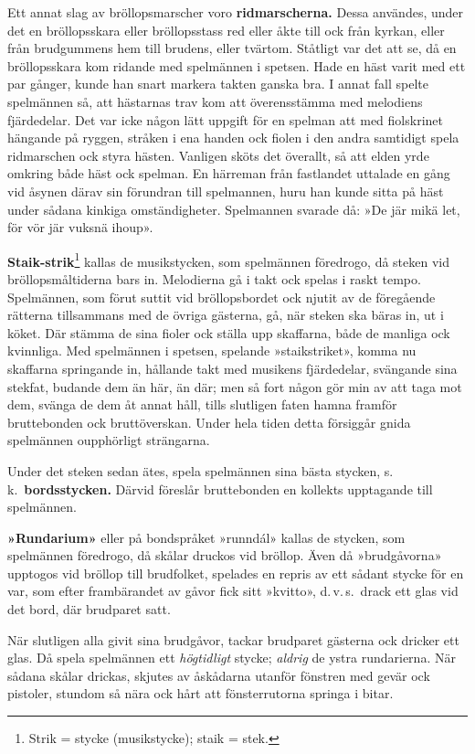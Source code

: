 \begin{multicols}{2}
Ett annat slag av bröllopsmarscher voro \textbf{ridmarscherna.} Dessa
användes, under det en bröllopsskara eller bröllopsstass red eller
åkte till ock från kyrkan, eller från brudgummens hem till brudens,
eller tvärtom. Ståtligt var det att se, då en bröllopsskara kom ridande
med spelmännen i spetsen. Hade en häst varit med ett par gånger, kunde
han snart markera takten ganska bra. I annat fall spelte spelmännen
så, att hästarnas trav kom att överensstämma med melodiens fjärdedelar.
Det var icke någon lätt uppgift för en spelman att med fiolskrinet
hängande på ryggen, stråken i ena handen ock fiolen i den andra samtidigt
spela ridmarschen ock styra hästen. Vanligen sköts det överallt, så
att elden yrde omkring både häst ock spelman. En härreman från fastlandet
uttalade en gång vid åsynen därav sin förundran till spelmannen, huru
han kunde sitta på häst under sådana kinkiga omständigheter. Spelmannen
svarade då: »De jär mikä let, för vör jär vuksnä ihoup».

\textbf{Staik-strik}\footnote{Strik = stycke (musikstycke); staik = stek.}
kallas de musikstycken, som spelmännen föredrogo, då steken vid bröllops\-mål\-tid\-erna
bars in. Melodierna gå i  takt ock spelas i raskt tempo.
Spelmännen, som förut suttit vid bröllopsbordet ock njutit av de föregående
rätterna tillsammans med de övriga gästerna, gå, när steken ska bäras
in, ut i köket. Där stämma de sina fioler ock ställa upp skaffarna,
både de manliga ock kvinnliga. Med spelmännen i spetsen, spelande
»staikstriket», komma nu skaffarna springande in, hållande takt med
musikens fjärdedelar, svängande sina stekfat, budande dem än här,
än där; men så fort någon gör min av att taga mot dem, svänga de dem
åt annat håll, tills slutligen faten hamna framför bruttebonden ock
bruttöverskan. Under hela tiden detta försiggår gnida spelmännen oupphörligt
strängarna.

Under det steken sedan ätes, spela spelmännen sina bästa stycken,
s.\,k.\ \textbf{bordsstycken.} Därvid föreslår bruttebonden en kollekts
upptagande till spelmännen.

\textbf{»Rundarium»} eller på bondspråket »runndál» kallas de stycken,
som spelmännen föredrogo, då skålar druckos vid bröllop. Även då »brudgåvorna»
upptogos vid bröllop till brudfolket, spelades en repris av ett sådant
stycke för en var, som efter frambärandet av gåvor fick sitt »kvitto»,
d.\,v.\,s.\ drack ett glas vid det bord, där brudparet satt.

När slutligen alla givit sina brudgåvor, tackar brudparet gästerna
ock dricker ett glas. Då spela spelmännen ett \textit{högtidligt}
stycke; \textit{aldrig} de ystra rundarierna. När sådana skålar drickas,
skjutes av åskådarna utanför fönstren med gevär ock pistoler, stundom
så nära ock hårt att fönsterrutorna springa i bitar.
\end{multicols}
